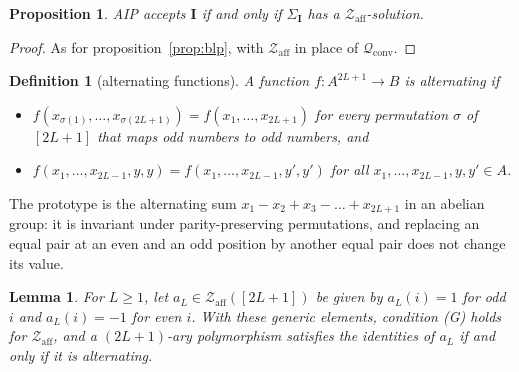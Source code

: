 \documentclass[11pt]{article}
\theoremstyle{plain}
\newtheorem{proposition}[theorem]{Proposition}
\newtheorem{lemma}[theorem]{Lemma}
\newtheorem{definition}[theorem]{Definition}
\theoremstyle{definition}
\newcommand{\bI}{\mathbf{I}}
\newcommand{\Qc}{\mathscr{Q}_{\mathrm{conv}}}
\newcommand{\Za}{\mathscr{Z}_{\mathrm{aff}}}
\begin{document}
\begin{proposition}\label{prop:aip}
AIP accepts $\bI$ if and only if $\Sigma_{\bI}$ has a $\Za$-solution.
\end{proposition}

\begin{proof}
As for proposition~\ref{prop:blp}, with $\Za$ in place of $\Qc$.
\end{proof}

\begin{definition}[alternating functions]
A function $f\colon A^{2L+1}\to B$ is \emph{alternating} if
\begin{itemize}
  \item $f(x_{\sigma(1)},\dots,x_{\sigma(2L+1)})=f(x_1,\dots,x_{2L+1})$ for every permutation $\sigma$ of $[2L+1]$ that maps odd numbers to odd numbers, and
  \item $f(x_1,\dots,x_{2L-1},y,y)=f(x_1,\dots,x_{2L-1},y',y')$ for all $x_1,\dots,x_{2L-1},y,y'\in A$.
\end{itemize}
\end{definition}

The prototype is the alternating sum $x_1-x_2+x_3-\dots+x_{2L+1}$ in an abelian group: it is invariant under parity-preserving permutations, and replacing an equal pair at an even and an odd position by another equal pair does not change its value.

\begin{lemma}\label{lem:gen-Z}
For $L\geq1$, let $a_L\in\Za([2L+1])$ be given by $a_L(i)=1$ for odd $i$ and $a_L(i)=-1$ for even $i$. With these generic elements, condition (G) holds for $\Za$, and a $(2L+1)$-ary polymorphism satisfies the identities of $a_L$ if and only if it is alternating.
\end{lemma}
\end{document}
